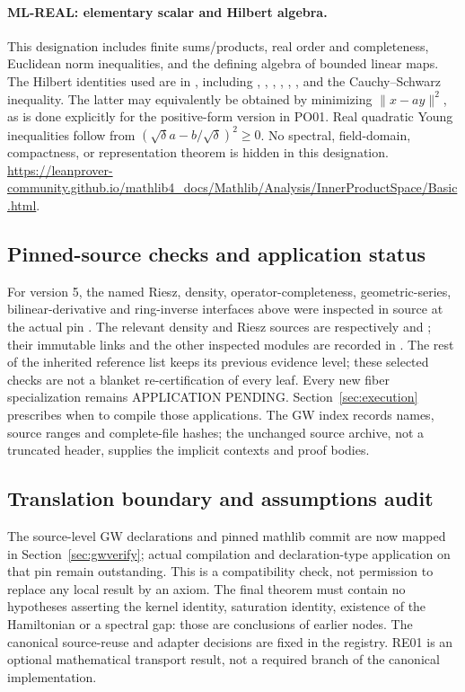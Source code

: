 \documentclass[11pt,a4paper]{article}
\theoremstyle{remark}\newtheorem{remark}[theorem]{Remark}
\newcommand{\contract}[1]{\textsf{#1}}
\begin{document}
\hypertarget{leaf:ML-REAL}{}\paragraph{ML-REAL: elementary scalar and Hilbert algebra.}
This designation includes finite sums/products, real order and completeness, Euclidean norm inequalities, and the defining algebra of bounded linear maps. The Hilbert identities used are in , including
, , ,
, ,
, and the Cauchy--Schwarz inequality.
The latter may equivalently be obtained by minimizing $\|x-ay\|^2$, as is done explicitly for the positive-form version in PO01. Real quadratic Young inequalities follow from $(\sqrt\delta a-b/\sqrt\delta)^2\geq0$. No spectral, field-domain, compactness, or representation theorem is hidden in this designation.
\url{https://leanprover-community.github.io/mathlib4_docs/Mathlib/Analysis/InnerProductSpace/Basic.html}.

\subsection{Pinned-source checks and application status}\label{sec:pinnedcontracts}
For version 5, the named Riesz, density, operator-completeness, geometric-series, bilinear-derivative and ring-inverse interfaces above were inspected in source at the actual pin . The relevant density and Riesz sources are respectively
 and ; their immutable links and the other inspected modules are recorded in . The rest of the inherited reference list keeps its previous evidence level; these selected checks are not a blanket re-certification of every leaf. Every new fiber specialization remains \contract{APPLICATION PENDING}. Section~\ref{sec:execution} prescribes when to compile those applications. The GW index records names, source ranges and complete-file hashes; the unchanged source archive, not a truncated header, supplies the implicit contexts and proof bodies.

\subsection{Translation boundary and assumptions audit}
The source-level GW declarations and pinned mathlib commit are now mapped in Section~\ref{sec:gwverify}; actual compilation and declaration-type application on that pin remain outstanding. This is a compatibility check, not permission to replace any local result by an axiom. The final theorem must contain no hypotheses asserting the kernel identity, saturation identity, existence of the Hamiltonian or a spectral gap: those are conclusions of earlier nodes. The canonical source-reuse and adapter decisions are fixed in the registry. RE01 is an optional mathematical transport result, not a required branch of the canonical implementation.
\end{document}
